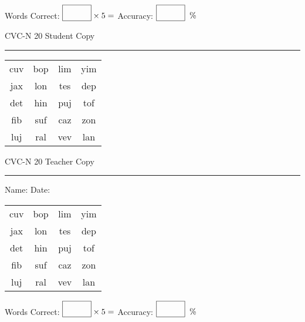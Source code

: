 \documentclass{memoir}
\begin{document}
\small

Words Correct: $\fbox{\phantom{\huge 100}} \times 5 = $ Accuracy: $\fbox{\phantom{\huge 100}}\;\; \%$ 

\vfill

\newpage



\footnotesize \noindent
CVC-N 20 \hfill Student Copy
\smallskip
\hrule

\Large

\setlength{\tabcolsep}{14pt}
\def\arraystretch{2}

{\selectfont


\begin{vplace}[0.5]
\begin{center}
\begin{tabular}{cccc}
cuv & bop & lim & yim \\
jax & lon & tes & dep \\
det & hin & puj & tof \\
fib & suf & caz & zon \\
luj & ral & vev & lan \\
\end{tabular}
\end{center}
\end{vplace}

}

\newpage

\footnotesize \noindent
CVC-N 20 \hfill Teacher Copy
\smallskip
\hrule

\small

\vfill

\noindent
Name: \underline{\hspace{1.75in}} \hfill Date: \underline{\hspace{1in}}

\Large

{\selectfont


\begin{vplace}[0.5]
\begin{center}
\begin{tabular}{cccc}
cuv & bop & lim & yim \\
jax & lon & tes & dep \\
det & hin & puj & tof \\
fib & suf & caz & zon \\
luj & ral & vev & lan \\
\end{tabular}
\end{center}
\end{vplace}



}

\small

Words Correct: $\fbox{\phantom{\huge 100}} \times 5 = $ Accuracy: $\fbox{\phantom{\huge 100}}\;\; \%$ 

\vfill

\end{document}
